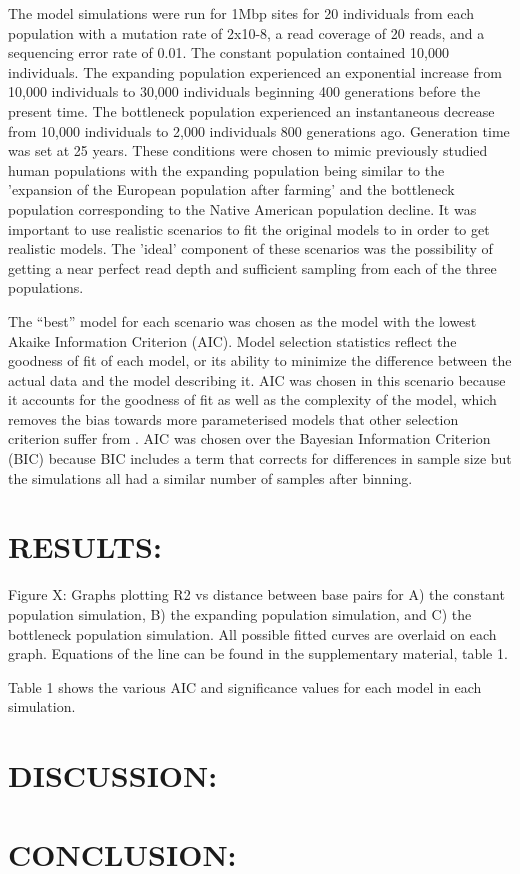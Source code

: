 \documentclass[11pt]{article}
\begin{document}
\begin{linenumbers}
The model simulations were run for 1Mbp sites for 20 individuals from each population with a mutation rate of 2x10-8, a read coverage of 20 reads, and a sequencing error rate of 0.01. The constant population contained 10,000 individuals. The expanding population experienced an exponential increase from 10,000 individuals to 30,000 individuals beginning 400 generations before the present time. The bottleneck population experienced an instantaneous decrease from 10,000 individuals to 2,000 individuals 800 generations ago. Generation time was set at 25 years. These conditions were chosen to mimic previously studied human populations with the expanding population being similar to the 'expansion of the European population after farming' and the bottleneck population corresponding to the Native American population decline. It was important to use realistic scenarios to fit the original models to in order to get realistic models. The 'ideal' component of these scenarios was the possibility of getting a near perfect read depth and sufficient sampling from each of the three populations. 

The “best” model for each scenario was chosen as the model with the lowest Akaike Information Criterion (AIC). Model selection statistics reflect the goodness of fit of each model, or its ability to minimize the difference between the actual data and the model describing it. AIC was chosen in this scenario because it accounts for the goodness of fit as well as the complexity of the model, which removes the bias towards more parameterised models that other selection criterion suffer from \citep{johnson2004model}. AIC was chosen over the Bayesian Information Criterion (BIC) because BIC includes a term that corrects for differences in sample size but the simulations all had a similar number of samples after binning. 

\section{RESULTS:}
Figure X: Graphs plotting R2 vs distance between base pairs for A) the constant population simulation, B) the expanding population simulation, and C) the bottleneck population simulation. All possible fitted curves are overlaid on each graph. Equations of the line can be found in the supplementary material, table 1. 

Table 1 shows the various AIC and significance values for each model in each simulation. 

\section{DISCUSSION:}

\section{CONCLUSION:}

\end{linenumbers}


\end{document}
